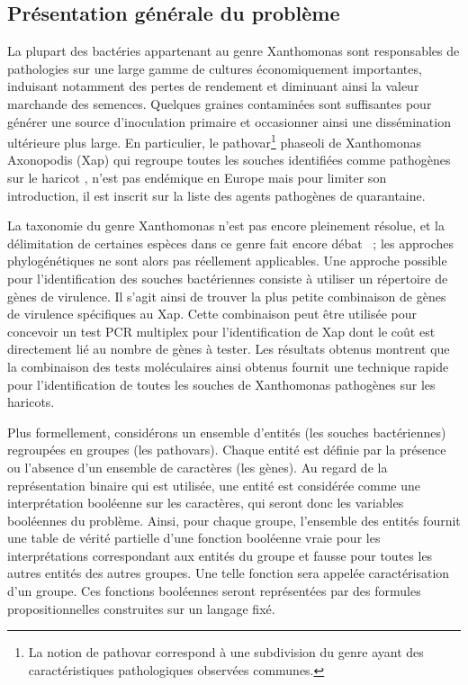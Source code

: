 \subsection{Présentation générale du problème}
La plupart des bactéries appartenant au genre Xanthomonas sont responsables de pathologies sur une large gamme de cultures économiquement importantes,  induisant notamment  des pertes de rendement et diminuant ainsi la valeur marchande des semences. Quelques graines contaminées sont suffisantes pour générer une source d'inoculation primaire et occasionner ainsi une dissémination ultérieure plus large. En particulier, le pathovar\footnote{La notion de pathovar correspond à une subdivision du genre ayant des caractéristiques pathologiques observées communes.} phaseoli de  Xanthomonas Axonopodis (Xap) qui regroupe toutes les souches identifiées comme pathogènes sur le haricot \cite{Vauterin1995}, n'est pas endémique en Europe mais pour limiter son introduction, il est inscrit sur la liste des agents pathogènes de quarantaine.

La taxonomie du genre Xanthomonas n'est pas encore pleinement résolue, et la délimitation de certaines espèces dans ce genre fait encore débat \cite{Schaad2005}~; les approches phylogénétiques ne sont alors pas réellement applicables. Une approche possible pour l'identification des souches bactériennes consiste à utiliser un répertoire de gènes de virulence. Il s'agit ainsi de trouver la plus petite combinaison de gènes de virulence spécifiques au Xap. Cette combinaison peut être utilisée pour concevoir un test PCR multiplex pour l'identification de Xap \cite{Boureau2013,Boureau2012} dont le coût est directement lié au nombre de gènes à tester. Les résultats obtenus
montrent que la combinaison des tests moléculaires ainsi obtenus fournit une technique rapide pour l'identification de toutes les souches de Xanthomonas pathogènes sur les haricots.

Plus formellement, considérons un ensemble d'entités (les souches bactériennes) regroupées en groupes (les pathovars). Chaque entité est définie par la présence ou l'absence d'un ensemble de caractères (les gènes). Au regard de la représentation binaire qui est utilisée, une entité est considérée comme une interprétation booléenne sur les caractères, qui seront donc les variables booléennes du problème. Ainsi, pour chaque groupe, l'ensemble des entités fournit une table de vérité partielle d'une fonction booléenne vraie pour les interprétations correspondant aux entités du groupe et fausse pour toutes les autres entités des autres groupes. Une telle fonction sera appelée caractérisation d'un groupe. Ces fonctions booléennes seront représentées par des formules propositionnelles construites sur un langage fixé.



